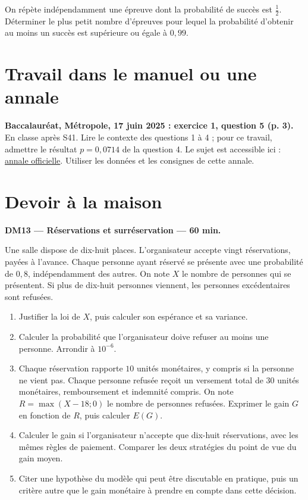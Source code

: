 On répète indépendamment une épreuve dont la probabilité de succès est $\frac12$. Déterminer le plus petit nombre d'épreuves pour lequel la probabilité d'obtenir au moins un succès est supérieure ou égale à $0{,}99$.

\section{Travail dans le manuel ou une annale}\textbf{Baccalauréat, Métropole, 17 juin 2025 : exercice 1, question 5 (p. 3).} En classe après S41. Lire le contexte des questions 1 à 4 ; pour ce travail, admettre le résultat $p=0{,}0714$ de la question 4. Le sujet est accessible ici : \href{https://www.education.gouv.fr/sites/default/files/2025-06/baccalaur-at-g-n-ral-2025-math-matiques-440856.pdf}{annale officielle}. Utiliser les données et les consignes de cette annale.

\section{Devoir à la maison}\textbf{DM13 --- Réservations et surréservation --- 60 min.}\par Une salle dispose de dix-huit places. L'organisateur accepte vingt réservations, payées à l'avance. Chaque personne ayant réservé se présente avec une probabilité de $0{,}8$, indépendamment des autres. On note $X$ le nombre de personnes qui se présentent. Si plus de dix-huit personnes viennent, les personnes excédentaires sont refusées.
\begin{enumerate}\item Justifier la loi de $X$, puis calculer son espérance et sa variance.
\item Calculer la probabilité que l'organisateur doive refuser au moins une personne. Arrondir à $10^{-6}$.
\item Chaque réservation rapporte $10$ unités monétaires, y compris si la personne ne vient pas. Chaque personne refusée reçoit un versement total de $30$ unités monétaires, remboursement et indemnité compris. On note $R=\max(X-18;0)$ le nombre de personnes refusées. Exprimer le gain $G$ en fonction de $R$, puis calculer $E(G)$.
\item Calculer le gain si l'organisateur n'accepte que dix-huit réservations, avec les mêmes règles de paiement. Comparer les deux stratégies du point de vue du gain moyen.
\item Citer une hypothèse du modèle qui peut être discutable en pratique, puis un critère autre que le gain monétaire à prendre en compte dans cette décision.\end{enumerate}

